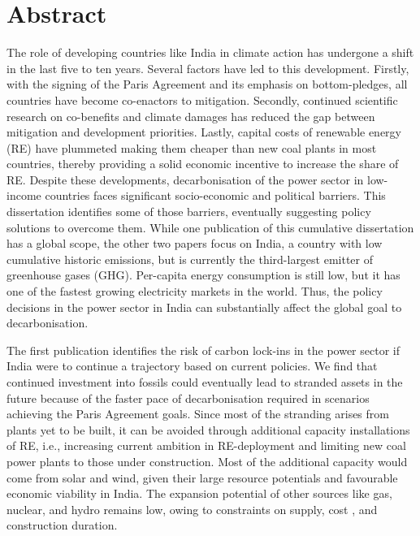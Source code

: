 \documentclass[../thesis.tex]{subfiles}
\begin{document}
\chapter*{Abstract}
The role of developing countries like India in climate action has undergone a shift in the last five to ten years. Several factors have led to this development. Firstly, with the signing of the Paris Agreement and its emphasis on bottom-pledges, all countries have become co-enactors to mitigation. Secondly, continued scientific research on co-benefits and climate damages has reduced the gap between mitigation and development priorities. Lastly, capital costs of renewable energy (RE) have plummeted making them cheaper than new coal plants in most countries, thereby providing a solid economic incentive to increase the share of RE. Despite these developments, decarbonisation of the power sector in low-income countries faces significant socio-economic and political barriers. This dissertation identifies some of those barriers, eventually suggesting policy solutions to overcome them. While one publication of this cumulative dissertation %
has a global scope, the other two papers focus on India, a country with low cumulative historic emissions, but is currently the third-largest emitter of greenhouse gases (GHG). Per-capita energy consumption is still low, but it has one of the fastest growing electricity markets in the world. Thus, the policy decisions in the power sector in India can substantially affect the global goal to decarbonisation.

The first publication identifies the risk of carbon lock-ins in the power sector if India were to continue a trajectory based on current policies. We find that continued investment into fossils could eventually lead to stranded assets in the future because of the faster pace of decarbonisation required in scenarios achieving the Paris Agreement goals. Since most of the stranding arises from plants yet to be built, it can be avoided through additional capacity installations of RE, i.e., increasing current ambition in RE-deployment  %
and limiting new coal power plants to those under construction. Most of the additional capacity would come from solar and wind, given their large resource potentials %
and favourable economic viability in India. The expansion potential of other sources like gas, nuclear, and hydro remains low, owing to constraints on supply, cost %
, and construction duration.
\end{document}
